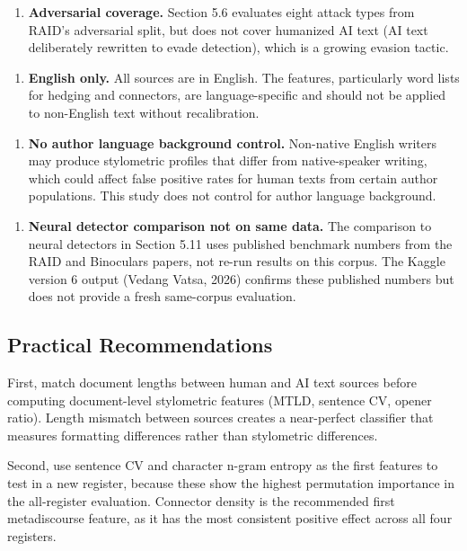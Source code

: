 \documentclass{article}
\begin{document}
\begin{enumerate}
  \item \textbf{Adversarial coverage.} Section 5.6 evaluates eight attack types from RAID's adversarial split, but does not cover humanized AI text (AI text deliberately rewritten to evade detection), which is a growing evasion tactic.
\end{enumerate}

\begin{enumerate}
  \item \textbf{English only.} All sources are in English. The features, particularly word lists for hedging and connectors, are language-specific and should not be applied to non-English text without recalibration.
\end{enumerate}

\begin{enumerate}
  \item \textbf{No author language background control.} Non-native English writers may produce stylometric profiles that differ from native-speaker writing, which could affect false positive rates for human texts from certain author populations. This study does not control for author language background.
\end{enumerate}

\begin{enumerate}
  \item \textbf{Neural detector comparison not on same data.} The comparison to neural detectors in Section 5.11 uses published benchmark numbers from the RAID and Binoculars papers, not re-run results on this corpus. The Kaggle version 6 output (Vedang Vatsa, 2026) confirms these published numbers but does not provide a fresh same-corpus evaluation.
\end{enumerate}

\subsection{Practical Recommendations}

First, match document lengths between human and AI text sources before computing document-level stylometric features (MTLD, sentence CV, opener ratio). Length mismatch between sources creates a near-perfect classifier that measures formatting differences rather than stylometric differences.

Second, use sentence CV and character n-gram entropy as the first features to test in a new register, because these show the highest permutation importance in the all-register evaluation. Connector density is the recommended first metadiscourse feature, as it has the most consistent positive effect across all four registers.
\end{document}
